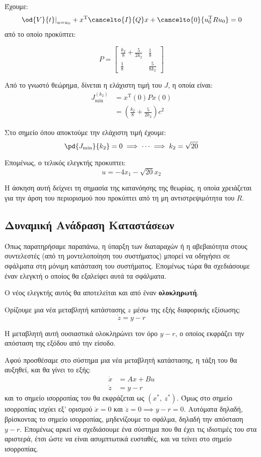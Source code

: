 \documentclass[11pt,a4paper,notitlepage,fleqn]{article}
\let\mytodo\todo
\renewcommand{\todo}[1]{\par\mytodo[inline,noline]{#1}}
\begin{document}
\begin{exercise}
	Έχουμε:
	\[
	\left.\od{V}{t}\right|_{u=u_0}
	+x^{\mathrm T} \cancelto{I}{Q} x
	+\cancelto{0}{u_0^{\mathrm T} R u_0} = 0
	\]
	από το οποίο προκύπτει: \todo{πράξεις}
	\[
	P = \left[\begin{matrix}
	\frac{k_2}{8} + \frac{5}{2k_2} & \frac{1}{8}\\
	\frac{1}{8} & \frac{5}{8k_2}
	\end{matrix}\right]
	\]

	Από το γνωστό θεώρημα, δίνεται η ελάχιστη τιμή του \( J \), η οποία
	είναι:
	\begin{align*}
		J_{\min}^{(k_2)} &= x^{\mathrm{T}}(0) P x(0)\\ &=
		\left(\frac{k_2}{8} + \frac{5}{2k_2}\right)c^2
	\end{align*}

	Στο σημείο όπου αποκτούμε την ελάχιστη τιμή έχουμε:
	\[
	\pd{J_{\min}}{k_2} = 0 \implies \dots \implies k_2 = \sqrt{20}
	\]

	Επομένως, ο τελικός ελεγκτής προκυπτει:
	\[
	u  = -4x_1 - \sqrt{20}x_2
	\]

	Η άσκηση αυτή δείχνει τη σημασία της κατανόησης της θεωρίας, η οποία
	χρειάζεται για την άρση του περιορισμού που προκύπτει από τη
	μη αντιστρεψιμότητα του \( R \).
\end{exercise}

\subsection{Δυναμική Ανάδραση Καταστάσεων}
Όπως παρατηρήσαμε παραπάνω, η ύπαρξη των διαταραχών ή η αβεβαιότητα
στους συντελεστές (από τη μοντελοποίηση του συστήματος) μπορεί να
οδηγήσει σε σφάλματα στη μόνιμη κατάσταση του συστήματος. Επομένως
τώρα θα σχεδιάσουμε έναν ελεγκτή ο οποίος θα εξαλείφει αυτά τα σφάλματα.

Ο νέος ελεγκτής αυτός θα αποτελείται και από έναν \textbf{ολοκληρωτή}.

Ορίζουμε μια νέα μεταβλητή κατάστασης \( z \) μέσω της εξής διαφορικής
εξίσωσης:
\[
\dot z = y - r
\]

Η μεταβλητή αυτή ουσιαστικά ολοκληρώνει τον όρο \( y-r \), ο οποίος εκφράζει την απόσταση της εξόδου από την είσοδο.

Αφού προσθέσαμε στο σύστημα μια νέα μεταβλητή κατάστασης, η τάξη του θα αυξηθεί, και θα γίνει το εξής:
\begin{align*}
    \dot x &= Ax+Bu\\
	\dot z &= y-r
\end{align*}
και το σημείο ισορροπίας του θα εκφράζεται ως \( (x^*,\ z^*) \). Όμως
στο σημείο ισορροπίας ισχύει εξ' ορισμού \( \dot x = 0 \) και \( \dot z = 0 \implies y-r = 0 \). Αυτόματα δηλαδή, βρίσκοντας το σημείο ισορροπίας,
μηδενίζουμε το σφάλμα, δηλαδή την απόσταση \( y-r \). Επομένως
αρκεί να σχεδιάσουμε ένα σύστημα που θα έχει τις ιδιοτιμές του στα
αριστερά, έτσι ώστε να είναι ασυμπτωτικά ευσταθές, και να τείνει στο
σημείο ισορροπίας.
\end{document}
